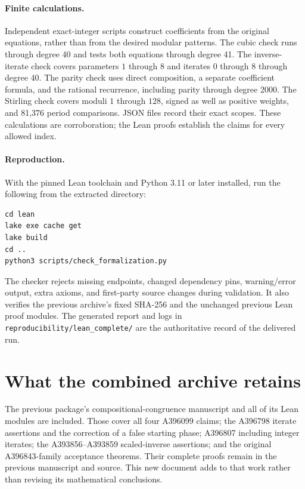 \documentclass[11pt,a4paper]{article}
\theoremstyle{remark}
\begin{document}
\paragraph{Finite calculations.}
Independent exact-integer scripts construct coefficients from the
original equations, rather than from the desired modular patterns.
The cubic check runs through degree 40 and tests both equations through
degree 41. The inverse-iterate check covers parameters $1$ through $8$
and iterates $0$ through $8$ through degree 40. The parity check uses
direct composition, a separate coefficient formula, and the rational
recurrence, including parity through degree 2000. The Stirling check
covers moduli $1$ through $128$, signed as well as positive weights,
and 81,376 period comparisons. JSON files record their exact scopes.
These calculations are corroboration; the Lean proofs establish the
claims for every allowed index.

\paragraph{Reproduction.}
With the pinned Lean toolchain and Python 3.11 or later installed, run
the following from the extracted directory:
\begin{verbatim}
cd lean
lake exe cache get
lake build
cd ..
python3 scripts/check_formalization.py
\end{verbatim}
The checker rejects missing endpoints, changed dependency pins,
warning/error output, extra axioms, and first-party source changes
during validation. It also verifies the previous archive's fixed
SHA-256 and the unchanged previous Lean proof modules. The generated
report and logs in \texttt{reproducibility/lean\_complete/} are the
authoritative record of the delivered run.

\section{What the combined archive retains}

The previous package's compositional-congruence manuscript and all
of its Lean modules are included. Those cover all four A396099 claims;
the A396798 iterate assertions and the correction of a false starting
phase; A396807 including integer iterates; the A393856--A393859
scaled-inverse assertions; and the original A396843-family acceptance
theorems. Their complete proofs remain in the previous manuscript and
source. This new document adds to that work rather than revising its
mathematical conclusions.
\end{document}

